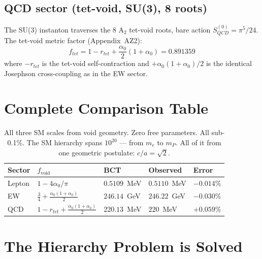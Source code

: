 \documentclass[aps,prl,twocolumn,superscriptaddress,floatfix]{revtex4-2}
\begin{document}
\subsection{QCD sector (tet-void, SU(3), 8 roots)}

The SU(3) instanton traverses the 8 A$_2$ tet-void roots,
bare action $S_{QCD}^{(0)} = \pi^5/24$.
The tet-void metric factor (Appendix~AZ2):
\begin{equation}
\boxed{f_{tet} = 1 - r_{tet}
+ \frac{\alpha_0}{2}(1+\alpha_0) = 0.891359}
\label{eq:ftet}
\end{equation}
where $-r_{tet}$ is the tet-void self-contraction and
$+\alpha_0(1+\alpha_0)/2$ is the identical Josephson
cross-coupling as in the EW sector.

\noindent{}

\section{Complete Comparison Table}

\begin{table}[h]
\centering
\begin{tabular}{lllll}
\toprule
Sector & $f_\text{void}$ & BCT & Observed & Error \\
\midrule
Lepton & $1-4\alpha_0/\pi$ & $0.5109$~MeV & $0.5110$~MeV & $-0.014\%$ \\
EW & $\tfrac{3}{4}+\tfrac{\alpha_0(1+\alpha_0)}{2}$ & $246.14$~GeV & $246.22$~GeV & $-0.030\%$ \\
QCD & $1-r_{tet}+\tfrac{\alpha_0(1+\alpha_0)}{2}$ & $220.13$~MeV & $220$~MeV & $+0.059\%$ \\
\bottomrule
\end{tabular}
\caption{All three SM scales from void geometry. Zero free parameters.
All sub-0.1\%. The SM hierarchy spans $10^{20}$ --- from $m_e$ to $m_P$.
All of it from one geometric postulate: $c/a = \sqrt{2}$.}
\end{table}

\section{The Hierarchy Problem is Solved}
\end{document}
